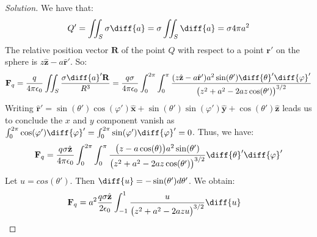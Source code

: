             \begin{proof}[Solution]
                We have that:
                \begin{equation*}
                    Q'=\iint_{S}\sigma\diff{a}
                    =\sigma\iint_{S}\diff{a}
                    =\sigma{4}\pi{a^{2}}
                \end{equation*}
                The relative position vector $\mathbf{R}$ of the point
                $Q$ with respect to a point $\mathbf{r}'$ on the sphere
                is $z\hat{\mathbf{z}}-a\hat{\mathbf{r}}'$. So:
                \begin{equation*}
                    \mathbf{F}_{q}
                    =\frac{q}{4\pi\epsilon_{0}}\iint_{S}
                    \frac{\sigma\diff{a}'\mathbf{R}}{R^{3}}
                    =\frac{q\sigma}{4\pi\epsilon_{0}}
                    \int_{0}^{2\pi}\int_{0}^{\pi}
                    \frac{(z\hat{\mathbf{z}}-a\hat{\mathbf{r}}')a^{2}
                          \sin(\theta')\diff{\theta}'\diff{\varphi}'}
                         {\big(z^2+a^2-2az\cos(\theta')\big)^{3/2}}
                \end{equation*}
                Writing
                $\hat{\mathbf{r}}'%
                 =\sin(\theta')\cos(\varphi')\hat{\mathbf{x}}%
                 +\sin(\theta')\sin(\varphi')\hat{\mathbf{y}}%
                 +\cos(\theta')\hat{\mathbf{z}}$
                leads us to conclude the $x$ and $y$ component vanish as
                $\int_{0}^{2\pi}\cos(\varphi')\diff{\varphi}'%
                 =\int_{0}^{2\pi}\sin(\varphi')\diff{\varphi}'%
                 =0$.
                Thus, we have:
                \begin{equation*}
                    \mathbf{F}_{q}
                    =\frac{q\sigma\hat{\mathbf{z}}}{4\pi\epsilon_{0}}
                    \int_{0}^{2\pi}\int_{0}^{\pi}
                    \frac{\big(z-a\cos(\theta)\big)a^{2}
                          \sin(\theta')}
                         {\big(z^{2}+a^{2}-2az\cos(\theta')\big)^{3/2}}
                    \diff{\theta}'\diff{\varphi}'
                \end{equation*}
                Let $u=cos(\theta')$.
                Then $\diff{u}=-\sin(\theta')d\theta'$. We obtain:
                \begin{align*}
                    \mathbf{F}_{q}
                    &=a^{2}\frac{q\sigma \hat{\mathbf{z}}}{2\epsilon_{0}}
                    \int_{-1}^{1}\frac{u}{\big(z^{2}+a^{2}-2azu\big)^{3/2}}\diff{u}
                    &

\end{align*}
\end{proof}
